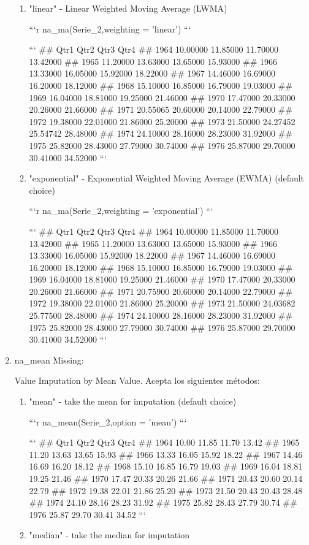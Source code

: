 \documentclass[
]{article}
\begin{document}
\begin{enumerate}
\begin{enumerate}
\item "linear" - Linear Weighted Moving Average (LWMA)

```r
na_ma(Serie_2,weighting = 'linear')
```

```
##          Qtr1     Qtr2     Qtr3     Qtr4
## 1964 10.00000 11.85000 11.70000 13.42000
## 1965 11.20000 13.63000 13.65000 15.93000
## 1966 13.33000 16.05000 15.92000 18.22000
## 1967 14.46000 16.69000 16.20000 18.12000
## 1968 15.10000 16.85000 16.79000 19.03000
## 1969 16.04000 18.81000 19.25000 21.46000
## 1970 17.47000 20.33000 20.26000 21.66000
## 1971 20.55065 20.60000 20.14000 22.79000
## 1972 19.38000 22.01000 21.86000 25.20000
## 1973 21.50000 24.27452 25.54742 28.48000
## 1974 24.10000 28.16000 28.23000 31.92000
## 1975 25.82000 28.43000 27.79000 30.74000
## 1976 25.87000 29.70000 30.41000 34.52000
```
\item "exponential" - Exponential Weighted Moving Average (EWMA) (default choice)

```r
na_ma(Serie_2,weighting = 'exponential')
```

```
##          Qtr1     Qtr2     Qtr3     Qtr4
## 1964 10.00000 11.85000 11.70000 13.42000
## 1965 11.20000 13.63000 13.65000 15.93000
## 1966 13.33000 16.05000 15.92000 18.22000
## 1967 14.46000 16.69000 16.20000 18.12000
## 1968 15.10000 16.85000 16.79000 19.03000
## 1969 16.04000 18.81000 19.25000 21.46000
## 1970 17.47000 20.33000 20.26000 21.66000
## 1971 20.75900 20.60000 20.14000 22.79000
## 1972 19.38000 22.01000 21.86000 25.20000
## 1973 21.50000 24.03682 25.77500 28.48000
## 1974 24.10000 28.16000 28.23000 31.92000
## 1975 25.82000 28.43000 27.79000 30.74000
## 1976 25.87000 29.70000 30.41000 34.52000
```
\end{enumerate}

\item

na\_mean Missing:

Value Imputation by Mean Value. Acepta los siguientes métodos:

\begin{enumerate}
\item "mean" - take the mean for imputation (default choice)

```r
na_mean(Serie_2,option = 'mean')
```

```
##       Qtr1  Qtr2  Qtr3  Qtr4
## 1964 10.00 11.85 11.70 13.42
## 1965 11.20 13.63 13.65 15.93
## 1966 13.33 16.05 15.92 18.22
## 1967 14.46 16.69 16.20 18.12
## 1968 15.10 16.85 16.79 19.03
## 1969 16.04 18.81 19.25 21.46
## 1970 17.47 20.33 20.26 21.66
## 1971 20.43 20.60 20.14 22.79
## 1972 19.38 22.01 21.86 25.20
## 1973 21.50 20.43 20.43 28.48
## 1974 24.10 28.16 28.23 31.92
## 1975 25.82 28.43 27.79 30.74
## 1976 25.87 29.70 30.41 34.52
```
\item "median" - take the median for imputation


\end{enumerate}
\end{enumerate}
\end{document}
